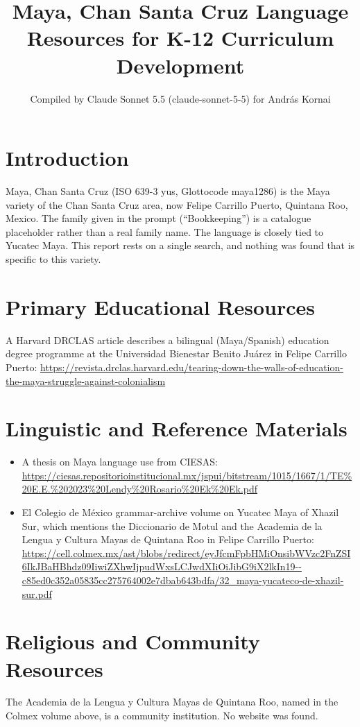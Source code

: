 \documentclass[12pt]{article}
\title{Maya, Chan Santa Cruz Language Resources for K-12 Curriculum Development}
\author{Compiled by Claude Sonnet 5.5 (claude-sonnet-5-5) for Andr\'as Kornai}
\date{}
\begin{document}
\maketitle

\section{Introduction}
Maya, Chan Santa Cruz (ISO 639-3 yus, Glottocode maya1286) is the Maya variety of the Chan Santa Cruz area, now Felipe Carrillo Puerto, Quintana Roo, Mexico. The family given in the prompt (``Bookkeeping'') is a catalogue placeholder rather than a real family name. The language is closely tied to Yucatec Maya. This report rests on a single search, and nothing was found that is specific to this variety.

\section{Primary Educational Resources}
A Harvard DRCLAS article describes a bilingual (Maya/Spanish) education degree programme at the Universidad Bienestar Benito Ju\'arez in Felipe Carrillo Puerto: \url{https://revista.drclas.harvard.edu/tearing-down-the-walls-of-education-the-maya-struggle-against-colonialism}

\section{Linguistic and Reference Materials}
\begin{itemize}
\item A thesis on Maya language use from CIESAS: \url{https://ciesas.repositorioinstitucional.mx/jspui/bitstream/1015/1667/1/TE%20E.E.%202023%20Lendy%20Rosario%20Ek%20Ek.pdf}
\item El Colegio de M\'exico grammar-archive volume on Yucatec Maya of Xhazil Sur, which mentions the Diccionario de Motul and the Academia de la Lengua y Cultura Mayas de Quintana Roo in Felipe Carrillo Puerto: \url{https://cell.colmex.mx/ast/blobs/redirect/eyJfcmFpbHMiOnsibWVzc2FnZSI6IkJBaHBhdz09IiwiZXhwIjpudWxsLCJwdXIiOiJibG9iX2lkIn19--c85ed0c352a05835cc275764002e7dbab643bdfa/32_maya-yucateco-de-xhazil-sur.pdf}
\end{itemize}

\section{Religious and Community Resources}
The Academia de la Lengua y Cultura Mayas de Quintana Roo, named in the Colmex volume above, is a community institution. No website was found.
\end{document}

